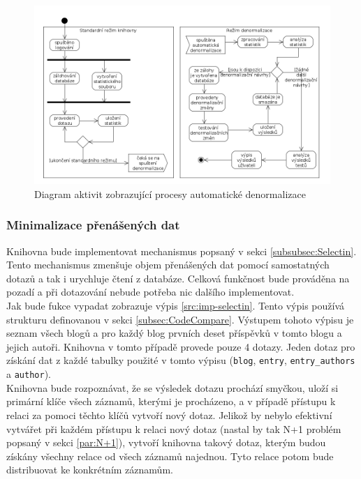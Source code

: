 \documentclass[ing,male,java,dept456]{diploma}						%
\begin{document}
\begin{figure}[h!]
    \centering
    \includegraphics[width=150mm]{autodenormalizace.png}
    \caption{Diagram aktivit zobrazující procesy automatické denormalizace}
    \label{fig:Autoden}
\end{figure}

\subsubsection{Minimalizace přenášených dat}

Knihovna bude implementovat mechanismus popsaný v sekci \ref{subsubsec:Selectin}. Tento mechanismus zmenšuje objem přenášených dat pomocí samostatných dotazů a tak i urychluje čtení z databáze. Celková funkčnost bude prováděna na pozadí a při dotazování nebude potřeba nic dalšího implementovat. \\
Jak bude fukce vypadat zobrazuje výpis \ref{src:imp-selectin}. Tento výpis používá strukturu definovanou v sekci \ref{subsec:CodeCompare}. Výstupem tohoto výpisu je seznam všech blogů a pro každý blog prvních deset příspěvků v tomto blogu a jejich autoři. Knihovna v tomto případě provede pouze 4 dotazy. Jeden dotaz pro získání dat z každé tabulky použité v tomto výpisu (\lstinline[style=inlinepython]|blog|, \lstinline[style=inlinepython]|entry|, \lstinline[style=inlinepython]|entry_authors| a \lstinline[style=inlinepython]|author|). \\
Knihovna bude rozpoznávat, že se výsledek dotazu prochází smyčkou, uloží si primární klíče všech záznamů, kterými je procházeno, a v případě přístupu k relaci za pomoci těchto klíčů vytvoří nový dotaz. Jelikož by nebylo efektivní vytvářet při každém přístupu k relaci nový dotaz (nastal by tak N+1 problém popsaný v sekci \ref{par:N+1}), vytvoří knihovna takový dotaz, kterým budou získány všechny relace od všech záznamů najednou. Tyto relace potom bude distribuovat ke konkrétním záznamům. \\
\end{document}
